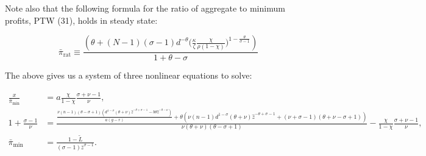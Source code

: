 \documentclass[11pt]{article}
\begin{document}
Note also that the following formula for the ratio of aggregate to minimum profits, PTW (31), holds in steady state:

\begin{equation}
	\bar{\pi}_{\text{rat}} \equiv \frac{\left(\theta + (N-1)(\sigma-1)d^{-\theta}\big(\frac{\kappa}{\zeta} \frac{\chi}{\rho (1-\chi)}\big)^{1 - \frac{\theta}{\sigma - 1}}\right)}{1 + \theta - \sigma}
\end{equation}

The above gives us a system of three nonlinear equations to solve:

		\begin{align}
		\frac{x}{\bar{\pi}_{\min}} &=  a \frac{\chi}{1-\chi}\frac{\sigma + \nu - 1}{\nu} , \\
		1 + \frac{\sigma - 1}{\nu} &= {\scriptstyle \frac{\frac{\nu  (n-1) (\theta -\sigma +1) \left(d^{1-\sigma } (\theta +\nu ) \hat{z}^{-\theta +\sigma -1}-b \theta  \hat{z}^{-\theta -\nu }\right)}{a (g-r)}+\theta  \left(\nu  (n-1) d^{1-\sigma } (\theta +\nu ) \hat{z}^{-\theta +\sigma -1}+(\nu +\sigma -1) (\theta +\nu -\sigma +1)\right)}{\nu  (\theta +\nu ) (\theta -\sigma +1)} -  \frac{\chi}{1-\chi}\frac{\sigma + \nu - 1}{\nu}} , \\
		\bar{\pi}_{\min} &= \tfrac{1 - \tilde{L}}{(\sigma - 1) \bar{z}^{\sigma - 1}}.
		\end{align}
\end{document}
